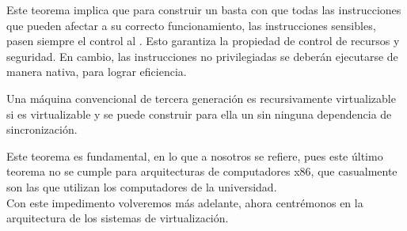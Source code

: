 Este teorema implica que para construir un  basta con que todas las instrucciones que pueden afectar a su correcto funcionamiento, las instrucciones sensibles, pasen siempre el control al . Esto garantiza la propiedad de control de recursos y seguridad. En cambio, las instrucciones no privilegiadas se deberán ejecutarse de manera nativa, para lograr eficiencia.

\begin{teorema}
Una máquina convencional de tercera generación es recursivamente virtualizable si es virtualizable y se puede construir para ella un  sin ninguna dependencia de sincronización.
\end{teorema}

Este teorema es fundamental, en lo que a nosotros se refiere, pues este último teorema no se cumple para arquitecturas de computadores x86, que casualmente son las que utilizan los computadores de la universidad.\\

Con este impedimento volveremos más adelante, ahora centrémonos en la arquitectura de los sistemas de virtualización.